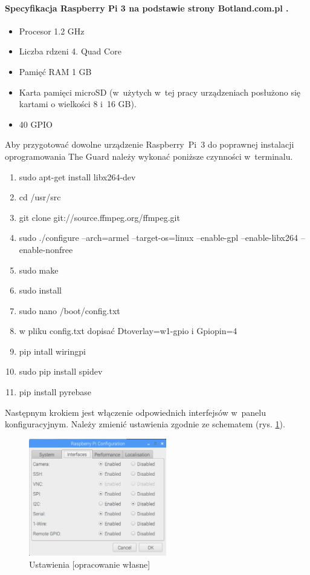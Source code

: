 \documentclass[polish,bachelor,a4paper,oneside]{ppfcmthesis}
\begin{document}
    \paragraph{Specyfikacja Raspberry Pi 3 na podstawie strony Botland.com.pl \cite{specyfikacja_rasp}.}
    \begin{itemize}
        \item Procesor 1.2 GHz
        \item Liczba rdzeni 4. Quad Core
        \item Pamięć RAM 1 GB
        \item Karta pamięci microSD (w~użytych w~tej pracy urządzeniach posłużono się kartami o wielkości 8 i~16 GB).
        \item 40 GPIO
    \end{itemize}
    Aby przygotować dowolne urządzenie Raspberry~Pi~3 do poprawnej instalacji oprogramowania The Guard należy wykonać poniższe czynności w~terminalu.
    \begin{enumerate}
        \item sudo apt-get install libx264-dev
        \item cd /usr/src
        \item git clone git://source.ffmpeg.org/ffmpeg.git
        \item sudo ./configure --arch=armel --target-os=linux --enable-gpl --enable-libx264 --enable-nonfree
        \item sudo make
        \item sudo install
        \item sudo nano /boot/config.txt
        \item w pliku config.txt dopisać Dtoverlay=w1-gpio i Gpiopin=4
        \item pip intall wiringpi
        \item sudo pip install spidev
        \item pip install pyrebase
    \end{enumerate}
    Następnym krokiem jest włączenie odpowiednich interfejsów w~panelu konfiguracyjnym. Należy zmienić ustawienia zgodnie ze schematem (rys. \ref{rs_settings}).
    \begin{figure}[H]
        \centering
        \includegraphics[width=6cm]{RSettings}
        \caption{Ustawienia [opracowanie własne]}
        \label{rs_settings}
    \end{figure}
\end{document}
